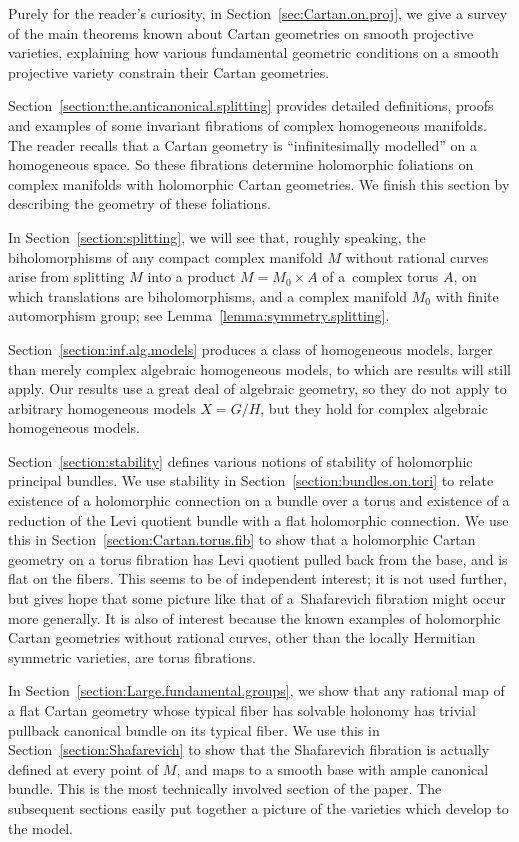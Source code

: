 \documentclass[pdftex]{sigma}
\numberwithin{equation}{section}
\begin{document}
Purely for the reader's curiosity, in Section~\ref{sec:Cartan.on.proj}, we give a survey of the main theorems known about Cartan
geometries on smooth projective varieties, explaining how various fundamental geometric conditions on a smooth projective variety
constrain their Cartan geometries.

Section~\ref{section:the.anticanonical.splitting} provides detailed definitions, proofs and examples of some invariant fibrations of complex homogeneous manifolds.
The reader recalls that a Cartan geometry is ``infinitesimally modelled'' on a homogeneous space.
So these fibrations determine holomorphic foliations on complex manifolds with holomorphic Cartan geometries.
We finish this section by describing the geometry of these foliations.

In Section~\ref{section:splitting}, we will see that, roughly speaking, the biholomorphisms of any compact complex manifold $M$ without rational curves arise from splitting $M$
into a product $M = M_0\times A$ of a~complex torus $A$, on which translations are biholomorphisms, and a complex manifold $M_0$ with
finite automorphism group; see Lemma~\ref{lemma:symmetry.splitting}.

Section~\ref{section:inf.alg.models} produces a class of homogeneous models, larger than merely complex algebraic homogeneous models, to which are results will still apply.
Our results use a great deal of algebraic geometry, so they do not apply to arbitrary homogeneous models $X = G/H$, but they hold for complex algebraic homogeneous models.

Section~\ref{section:stability} defines various notions of stability of holomorphic principal bundles.
We use stability in Section~\ref{section:bundles.on.tori} to relate existence of a holomorphic connection on a bundle over a torus and existence of a reduction of the Levi quotient bundle with a flat holomorphic connection.
We use this in Section~\ref{section:Cartan.torus.fib} to show that a holomorphic Cartan geometry on a torus fibration has Levi quotient pulled back from the base, and is flat on the fibers.
This seems to be of independent interest; it is not used further, but gives hope that some picture like that of a~Shafarevich fibration might occur more generally.
It is also of interest because the known examples of holomorphic Cartan geometries without rational curves, other than the locally Hermitian symmetric varieties, are torus fibrations.

In Section~\ref{section:Large.fundamental.groups}, we show that any rational map of a flat Cartan geometry whose typical fiber has solvable holonomy has trivial pullback canonical bundle on its typical fiber.
We use this in Section~\ref{section:Shafarevich} to show that the Shafarevich fibration is actually defined at every point of $M$, and maps to a smooth base with ample canonical bundle.
This is the most technically involved section of the paper.
The subsequent sections easily put together a picture of the varieties which develop to the model.
\end{document}
